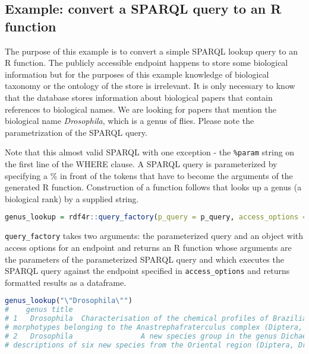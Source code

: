 \subsection{Example: convert a SPARQL query to an R function}

The purpose of this example is to convert a simple SPARQL lookup query to an R function. The publicly accessible endpoint happens to store some biological information but for the purposes of this example knowledge of biological taxonomy or the ontology of the store is irrelevant. It is only necessary to know that the database stores information about biological papers that contain references to biological names. We are looking for papers that mention the biological name \emph{Drosophila}, which is a genus of flies. Please note the parametrization of the SPARQL query.



Note that this almost valid SPARQL with one exception - the {\tt \%param} string on the first line of the WHERE clause. A SPARQL query is parameterized by specifying a \% in front of the tokens that have to become the arguments of the generated R function. Construction of a function follows that looks up a genus (a biological rank) by a supplied string.

\begin{lstlisting}[language=R,
basicstyle=\ttfamily\tiny]
genus_lookup = rdf4r::query_factory(p_query = p_query, access_options = openbiodiv)
\end{lstlisting}

{\tt query\_factory} takes two arguments: the parameterized query and an object with access options for an endpoint and returns an R function whose arguments are the parameters of the parameterized SPARQL query and which executes the SPARQL query against the endpoint specified in {\tt access\_options} and returns formatted results as a dataframe.

\begin{lstlisting}[language=R,
basicstyle=\ttfamily\tiny]
genus_lookup("\"Drosophila\"")
#    genus title
# 1   Drosophila  Characterisation of the chemical profiles of Brazilian and Andean
# morphotypes belonging to the Anastrephafraterculus complex (Diptera, Tephritidae)
# 2   Drosophila                A new species group in the genus Dichaetophora, with
# descriptions of six new species from the Oriental region (Diptera, Drosophilidae)
\end{lstlisting}

